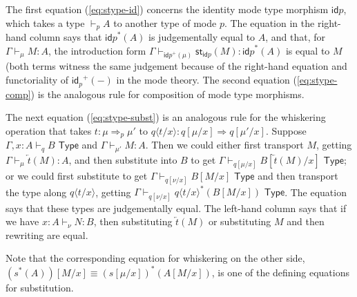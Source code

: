 \documentclass[10pt]{article}
\theoremstyle{definition}
\newcommand{\tcell}{\Rightarrow}
\newcommand{\TYPE}{\,\,\mathsf{Type}}
\newcommand{\id}{\mathsf{id}}
\newcommand{\rewrite}[2]{\overleftarrow{#1}(#2)}
\newcommand\F[2]{\ensuremath{\mathsf{F}_{#1}(#2)}}
\newcommand\St[2]{\ensuremath{{#1}^*(#2)}}
\newcommand\StI[2]{\ensuremath{\mathsf{st}_{#1}(#2)}}
\newcommand\TrPlus[2]{\ensuremath{{#1}^+(#2)}}
\newcommand\ap[2]{\ensuremath{#1 \langle #2 \rangle }}
\begin{document}
The first equation (\ref{eq:stype-id}) concerns the identity mode type
morphism $\id{p}$, which takes a type $\vdash_p A$ to another type of
mode $p$.  The equation in the right-hand column says that $\St{\id
  p}{A}$ is judgementally equal to $A$, and that, for $\Gamma \vdash_\mu
M : A$, the introduction form $\Gamma \vdash_{\TrPlus{\id p}{\mu}}
\StI{\id p}{M} : \St{\id p}{A}$ is equal to $M$ (both terms witness the
same judgement because of the right-hand equation and functoriality of
$\TrPlus{\id_p}{-}$ in the mode theory.  The second equation
(\ref{eq:stype-comp}) is the analogous rule for composition of mode type
morphisms.


The next equation (\ref{eq:stype-subst}) is an analogous rule for the
whiskering operation that takes $t : \mu \tcell_p \mu'$ to $\ap q {t/x} :
q[\mu/x] \tcell q[\mu'/x]$.  Suppose $\Gamma,x:A \vdash_q B \TYPE$ and
$\Gamma \vdash_{\mu'} M : A$.  Then we could either first transport $M$,
getting $\Gamma \vdash_\mu \rewrite{t}{M} : A$, and then substitute into
$B$ to get $\Gamma \vdash_{q[\mu/x]} B[\rewrite{t}{M}/x] \TYPE$; or we
could first substitute to get $\Gamma \vdash_{q[\nu/x]} B[M/x] \TYPE$
and then transport the type along $\ap q {t/x}$, getting $\Gamma
\vdash_{q[\nu/x]} \St{\ap q {t/x}}{B[M/x]} \TYPE$.  The equation says
that these types are judgementally equal.  The left-hand column says
that if we have $x : A \vdash_\nu N : B$, then substituting
$\rewrite{t}{M}$ or substituting $M$ and then rewriting are equal.

Note that the corresponding equation for whiskering on the other side,
$(\St{s}{A})[M/x] \equiv \St{(s[\mu/x])}{A[M/x]}$, is one of the
defining equations for substitution.
\end{document}
